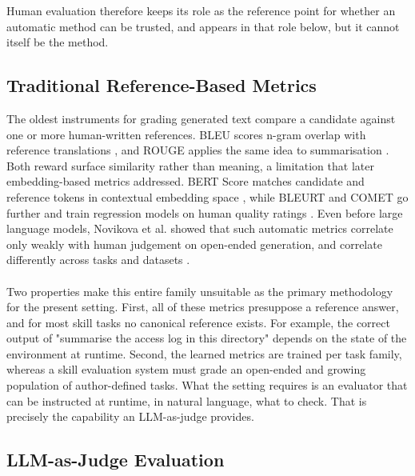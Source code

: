  \noindent Human evaluation therefore keeps its role as the reference point for whether an automatic method can be trusted, and appears in that role below, but it cannot itself be the method.



\subsection{Traditional Reference-Based Metrics}
The oldest instruments for grading generated text compare a candidate against one or more human-written references. BLEU scores n-gram overlap with reference translations \cite{papineni2002bleu}, and ROUGE applies the same idea to summarisation \cite{lin2004rouge}. Both reward surface similarity rather than meaning, a limitation that later embedding-based metrics addressed. BERT Score matches candidate and reference tokens in contextual embedding space \cite{zhang2020bertscore}, while BLEURT and COMET go further and train regression models on human quality ratings \cite{sellam2020bleurt}\cite{rei2020comet}. Even before large language models, Novikova et al. showed that such automatic metrics correlate only weakly with human judgement on open-ended generation, and correlate differently across tasks and datasets \cite{novikova2017why}. 
\\\\
Two properties make this entire family unsuitable as the primary methodology for the present setting. First, all of these metrics presuppose a reference answer, and for most skill tasks no canonical reference exists. For example, the correct output of "summarise the access log in this directory" depends on the state of the environment at runtime. Second, the learned metrics are trained per task family, whereas a skill evaluation system must grade an open-ended and growing population of author-defined tasks. What the setting requires is an evaluator that can be instructed at runtime, in natural language, what to check. That is precisely the capability an LLM-as-judge provides.

\subsection{LLM-as-Judge Evaluation}

